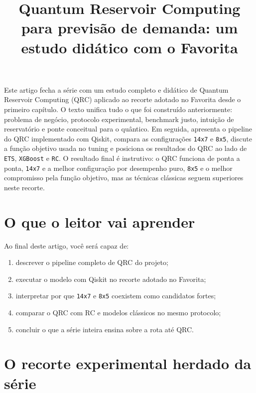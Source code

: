 \documentclass[12pt]{article}
\title{Quantum Reservoir Computing para previsão de demanda: um estudo didático com o Favorita}
\author{}
\providecommand{\tightlist}{%
          \setlength{\itemsep}{0pt}\setlength{\parskip}{0pt}}
\begin{document}
        \maketitle

        \begin{resumo}
        Este artigo fecha a série com um estudo completo e didático de Quantum Reservoir Computing (QRC) aplicado ao recorte adotado no Favorita desde o primeiro capítulo. O texto unifica tudo o que foi construído anteriormente: problema de negócio, protocolo experimental, benchmark justo, intuição de reservatório e ponte conceitual para o quântico. Em seguida, apresenta o pipeline do QRC implementado com Qiskit, compara as configurações \texttt{14x7} e \texttt{8x5}, discute a função objetivo usada no tuning e posiciona os resultados do QRC ao lado de \texttt{ETS}, \texttt{XGBoost} e \texttt{RC}. O resultado final é instrutivo: o QRC funciona de ponta a ponta, \texttt{14x7} e a melhor configuração por desempenho puro, \texttt{8x5} e o melhor compromisso pela função objetivo, mas as técnicas clássicas seguem superiores neste recorte.
        \end{resumo}

        \section{O que o leitor vai aprender}\label{1-o-que-o-leitor-vai-aprender}

Ao final deste artigo, você será capaz de:

\begin{enumerate}
\def\labelenumi{\arabic{enumi}.}
\tightlist
\item
  descrever o pipeline completo de QRC do projeto;
\item
  executar o modelo com Qiskit no recorte adotado no Favorita;
\item
  interpretar por que \texttt{14x7} e \texttt{8x5} coexistem como candidatos fortes;
\item
  comparar o QRC com RC e modelos clássicos no mesmo protocolo;
\item
  concluir o que a série inteira ensina sobre a rota até QRC.
\end{enumerate}

\section{O recorte experimental herdado da série}\label{2-o-recorte-experimental-herdado-da-suxe9rie}
\end{document}
